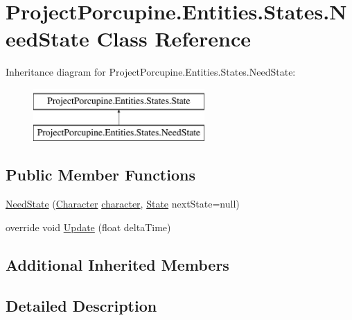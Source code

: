 \hypertarget{class_project_porcupine_1_1_entities_1_1_states_1_1_need_state}{}\section{Project\+Porcupine.\+Entities.\+States.\+Need\+State Class Reference}
\label{class_project_porcupine_1_1_entities_1_1_states_1_1_need_state}
Inheritance diagram for Project\+Porcupine.\+Entities.\+States.\+Need\+State\+:\begin{figure}[H]
\begin{center}
\leavevmode
\includegraphics[height=2.000000cm]{class_project_porcupine_1_1_entities_1_1_states_1_1_need_state}
\end{center}
\end{figure}
\subsection*{Public Member Functions}
\begin{DoxyCompactItemize}
\item 
\hyperlink{class_project_porcupine_1_1_entities_1_1_states_1_1_need_state_a1e6ff466a7af17a724663f497736f94c}{Need\+State} (\hyperlink{class_project_porcupine_1_1_entities_1_1_character}{Character} \hyperlink{class_project_porcupine_1_1_entities_1_1_states_1_1_state_a0647dd5dacc8fba22b1c462c954180c7}{character}, \hyperlink{class_project_porcupine_1_1_entities_1_1_states_1_1_state}{State} next\+State=null)
\item 
override void \hyperlink{class_project_porcupine_1_1_entities_1_1_states_1_1_need_state_a7719ba9d0ec106d384cb84f40e89b885}{Update} (float delta\+Time)
\end{DoxyCompactItemize}
\subsection*{Additional Inherited Members}


\subsection{Detailed Description}


